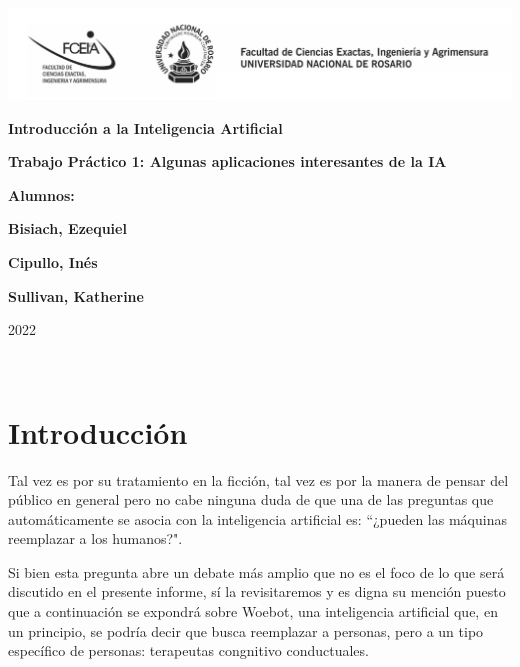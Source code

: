 \documentclass[11pt]{article}
\begin{document}
\begin{titlepage}
    \hspace{-2.5cm}\includegraphics[scale= 0.48]{header.png}
    \begin{center}
        \vfill
            \noindent\textbf{\Huge Introducción a la Inteligencia Artificial}\par
            \vspace{.5cm}
            \noindent\textbf{\Huge Trabajo Práctico 1: Algunas aplicaciones interesantes de la IA}\par
            \vspace{.5cm}
        \vfill
        \noindent \textbf{\huge Alumnos:}\par
        \vspace{.5cm}
        \noindent \textbf{\Large Bisiach, Ezequiel}\par
        \noindent \textbf{\Large Cipullo, Inés}\par
        \noindent \textbf{\Large Sullivan, Katherine}\par
 
        \vfill
        \noindent\large 2022
    \end{center}
\end{titlepage}
\ \par


\section{Introducción}
Tal vez es por su tratamiento en la ficción, tal vez es 
por la manera de pensar del público en general pero no
cabe ninguna duda de que una de las preguntas que 
automáticamente se asocia con la inteligencia artificial
es: ``¿pueden las máquinas reemplazar a los humanos?". 

Si 
bien esta pregunta abre un debate más amplio que no es el foco
de lo 
que será discutido en el presente informe, sí la revisitaremos y es digna 
su
mención puesto que a continuación se expondrá sobre
Woebot, una inteligencia artificial que,
en un principio, se podría decir
que busca reemplazar
a personas, pero a un tipo específico de personas: 
terapeutas congnitivo conductuales. 
\end{document}
